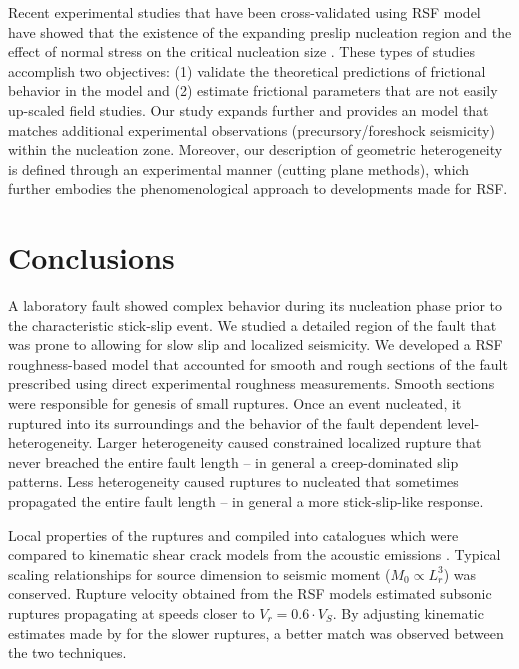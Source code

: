 \documentclass[preprint,1p, 10pt,authoryear]{elsarticle}
\begin{document}
Recent experimental studies that have been cross-validated using RSF model have showed that the existence of the expanding preslip nucleation region  \citep{Nielsen2010,Kaneko2011} and the effect of normal stress on the critical nucleation size \citep{Latour2013,Kaneko2016}. These types of studies accomplish two objectives: (1) validate the theoretical predictions of frictional behavior in the model \citep{Ruina1983,Rubin2005,Ampuero2008} and (2) estimate frictional parameters that are not easily up-scaled field studies. Our study expands further and provides an model that matches additional experimental observations (precursory/foreshock seismicity) within the nucleation zone. Moreover, our description of geometric heterogeneity is defined through an experimental manner (cutting plane methods), which further embodies the phenomenological approach to developments made for RSF.



\section{Conclusions}

A laboratory fault showed complex behavior during its nucleation phase prior to the characteristic stick-slip event.  We studied a detailed region of the fault that was prone to allowing for slow slip and localized seismicity.  We developed a RSF roughness-based model that accounted for smooth and rough sections of the fault prescribed using direct experimental roughness measurements. Smooth sections were responsible for genesis of small ruptures.  Once an event nucleated, it ruptured into its surroundings and the behavior of the fault dependent level-heterogeneity.  Larger heterogeneity caused constrained localized rupture that never breached the entire fault length -- in general a creep-dominated slip patterns. Less heterogeneity caused ruptures to nucleated that sometimes propagated the entire fault length -- in general a more stick-slip-like response.  

Local properties of the ruptures and compiled into catalogues which were compared to kinematic shear crack models from the acoustic emissions \citep{Selvadurai2019}.  Typical scaling relationships for source dimension to seismic moment ($M_{0} \propto L^{3}_{r}$) was conserved.  Rupture velocity obtained from the RSF models estimated subsonic ruptures propagating at speeds closer to $V_r = 0.6\cdot V_{S}$.  By adjusting kinematic estimates made by \citet{Selvadurai2019} for the slower ruptures, a better match was observed between the two techniques.
\end{document}
